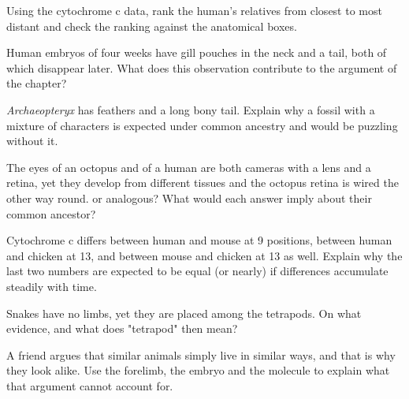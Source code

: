 \begin{exercise}[$\star\star$]\label{exo:g10:common-ancestry:9}
Using the cytochrome c data, rank the human's relatives from closest
to most distant and check the ranking against the anatomical boxes.
\end{exercise}

\begin{exercise}[$\star\star$]\label{exo:g10:common-ancestry:10}
Human embryos of four weeks have gill pouches in the neck and a tail,
both of which disappear later. What does this observation contribute
to the argument of the chapter?
\end{exercise}

\begin{exercise}[$\star\star$]\label{exo:g10:common-ancestry:11}
\emph{Archaeopteryx} has feathers and a long bony tail. Explain why a
fossil with a mixture of characters is expected under common ancestry
and would be puzzling without it.
\end{exercise}

\begin{exercise}[$\star\star\star$]\label{exo:g10:common-ancestry:12}
The eyes of an octopus and of a human are both cameras with a lens and
a retina, yet they develop from different tissues and the octopus
retina is wired the other way round.  or analogous? What
would each answer imply about their common ancestor?
\end{exercise}

\begin{exercise}[$\star\star\star$]\label{exo:g10:common-ancestry:13}
Cytochrome c differs between human and mouse at 9 positions, between
human and chicken at 13, and between mouse and chicken at 13 as well.
Explain why the last two numbers are expected to be equal (or nearly)
if differences accumulate steadily with time.
\end{exercise}

\begin{exercise}[$\star\star\star$]\label{exo:g10:common-ancestry:14}
Snakes have no limbs, yet they are placed among the tetrapods. On what
evidence, and what does "tetrapod" then mean?
\end{exercise}

\begin{exercise}[$\star\star\star$]\label{exo:g10:common-ancestry:15}
A friend argues that similar animals simply live in similar ways, and
that is why they look alike. Use the forelimb, the embryo and the
molecule to explain what that argument cannot account for.
\end{exercise}

